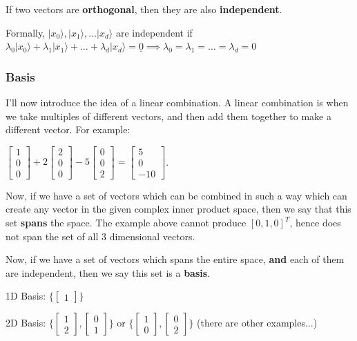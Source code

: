 \documentclass[12pt]{article}
\begin{document}
If two vectors are \textbf{orthogonal}, then they are also \textbf{independent}.

Formally, $\lvert x_0 \rangle, \lvert x_1 \rangle, \dots \lvert x_d \rangle$ are independent if $\lambda_0 \lvert x_0 \rangle + \lambda_1 \lvert x_1 \rangle + \dots + \lambda_d \lvert x_d \rangle = \underline{0} \implies \lambda_0 = \lambda_1 = \dots = \lambda_d = 0$

\subsubsection{Basis}
I'll now introduce the idea of a linear combination. A linear combination is when we take multiples of different vectors, and then add them together to make a different vector. For example:

$\begin{bmatrix} 1 \\ 0 \\ 0 \end{bmatrix} + 2\begin{bmatrix} 2 \\ 0 \\ 0 \end{bmatrix} - 5\begin{bmatrix} 0 \\ 0 \\ 2 \end{bmatrix} = \begin{bmatrix} 5 \\ 0 \\ -10 \end{bmatrix}$.

Now, if we have a set of vectors which can be combined in such a way which can create any vector in the given complex inner product space, then we say that this set \textbf{spans} the space. The example above cannot produce $[0 , 1, 0]^T$, hence does not span the set of all 3 dimensional vectors.

Now, if we have a set of vectors which spans the entire space, \textbf{and} each of them are independent, then we say this set is a \textbf{basis}. 

1D Basis: $\{\begin{bmatrix} 1 \end{bmatrix}\}$ 

2D Basis: $\{\begin{bmatrix} 1 \\ 2 \end{bmatrix}, \begin{bmatrix} 0 \\ 1 \end{bmatrix}\}$ or $\{\begin{bmatrix} 1 \\ 0 \end{bmatrix}, \begin{bmatrix} 0 \\ 2 \end{bmatrix}\}$ (there are other examples...)
\end{document}
